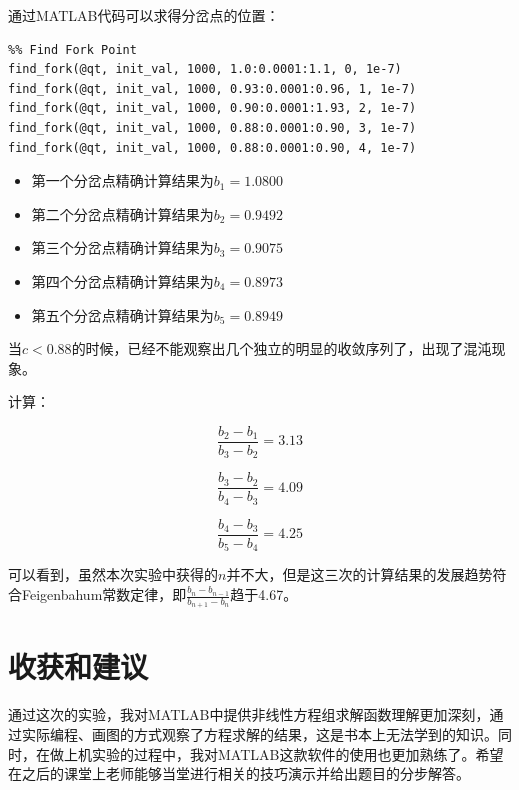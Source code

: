 \documentclass{article}
\begin{document}
通过MATLAB代码可以求得分岔点的位置：

\begin{lstlisting}
%% Find Fork Point
find_fork(@qt, init_val, 1000, 1.0:0.0001:1.1, 0, 1e-7)
find_fork(@qt, init_val, 1000, 0.93:0.0001:0.96, 1, 1e-7)
find_fork(@qt, init_val, 1000, 0.90:0.0001:1.93, 2, 1e-7)
find_fork(@qt, init_val, 1000, 0.88:0.0001:0.90, 3, 1e-7)
find_fork(@qt, init_val, 1000, 0.88:0.0001:0.90, 4, 1e-7)
\end{lstlisting}

\begin{itemize}
    \item{第一个分岔点精确计算结果为$b_1=1.0800$}
    \item{第二个分岔点精确计算结果为$b_2=0.9492$}
    \item{第三个分岔点精确计算结果为$b_3=0.9075$}
    \item{第四个分岔点精确计算结果为$b_4=0.8973$}
    \item{第五个分岔点精确计算结果为$b_5=0.8949$}
\end{itemize}

当$c<0.88$的时候，已经不能观察出几个独立的明显的收敛序列了，出现了混沌现象。

计算：

$$\frac{b_2-b_1}{b_3-b_2}=3.13$$

$$\frac{b_3-b_2}{b_4-b_3}=4.09$$

$$\frac{b_4-b_3}{b_5-b_4}=4.25$$

可以看到，虽然本次实验中获得的$n$并不大，但是这三次的计算结果的发展趋势符合Feigenbahum常数定律，即$\frac{b_n-b_{n-1}}{b_{n+1}-b_n}$趋于4.67。

\section{收获和建议}

通过这次的实验，我对MATLAB中提供非线性方程组求解函数理解更加深刻，通过实际编程、画图的方式观察了方程求解的结果，这是书本上无法学到的知识。同时，在做上机实验的过程中，我对MATLAB这款软件的使用也更加熟练了。希望在之后的课堂上老师能够当堂进行相关的技巧演示并给出题目的分步解答。
\end{document}
